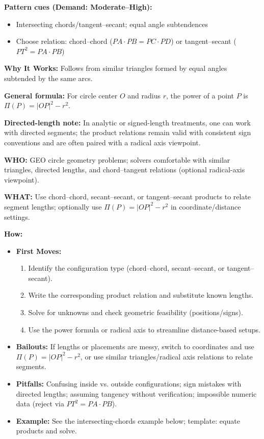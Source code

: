 \documentclass[12pt]{article}
\begin{document}
\textbf{Pattern cues (Demand: Moderate–High):}
\begin{itemize}
    \item Intersecting chords/tangent–secant; equal angle subtendences
    \item Choose relation: chord–chord ($PA\cdot PB=PC\cdot PD$) or tangent–secant ($PT^2=PA\cdot PB$)
\end{itemize}

\textbf{Why It Works:} Follows from similar triangles formed by equal angles subtended by the same arcs.

\textbf{General formula:} For circle center $O$ and radius $r$, the power of a point $P$ is $\Pi(P) = |OP|^2 - r^2$.

\textbf{Directed-length note:} In analytic or signed-length treatments, one can work with directed segments; the product relations remain valid with consistent sign conventions and are often paired with a radical axis viewpoint.

\textbf{WHO:} GEO circle geometry problems; solvers comfortable with similar triangles, directed lengths, and chord–tangent relations (optional radical-axis viewpoint).

\textbf{WHAT:} Use chord–chord, secant–secant, or tangent–secant products to relate segment lengths; optionally use $\Pi(P)=|OP|^2-r^2$ in coordinate/distance settings.


\textbf{How:}
\begin{itemize}
    \item \textbf{First Moves:}
    \begin{enumerate}[nosep]
        \item Identify the configuration type (chord–chord, secant–secant, or tangent–secant).
        \item Write the corresponding product relation and substitute known lengths.
        \item Solve for unknowns and check geometric feasibility (positions/signs).
        \item Use the power formula or radical axis to streamline distance-based setups.
    \end{enumerate}
    \item \textbf{Bailouts:} If lengths or placements are messy, switch to coordinates and use $\Pi(P)=|OP|^2-r^2$, or use similar triangles/radical axis relations to relate segments.
    \item \textbf{Pitfalls:} Confusing inside vs. outside configurations; sign mistakes with directed lengths; assuming tangency without verification; impossible numeric data (reject via $PT^2=PA\cdot PB$).
    \item \textbf{Example:} See the intersecting-chords example below; template: equate products and solve.
\end{itemize}
\end{document}

